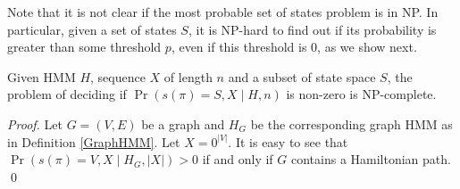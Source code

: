 \begin{reformulate*}



Note that it is not clear if the most probable set of states problem is in
NP. In particular, given a set of states $S$, it is NP-hard to find out if its
probability is greater than some threshold $p$, even if this threshold
is 0, as we show next.

\begin{theorem}
Given HMM $H$, sequence $X$ of length $n$ 
and a subset of state space $S$, the problem of deciding if
$\Pr\left(s(\pi)=S, X\mid H, n\right)$ is non-zero is NP-complete.
\end{theorem}

\begin{proof}
Let $G=(V,E)$ be a graph  
and $H_G$ be the corresponding graph HMM as
in Definition \ref{GraphHMM}. Let $X=0^{|V|}$.  
It is easy to see that $\Pr\left(s(\pi)=V,X \mid H_G, |X|
\right)>0$ if and only if $G$ contains a Hamiltonian path. \qed
\end{proof}


\end{reformulate*}
